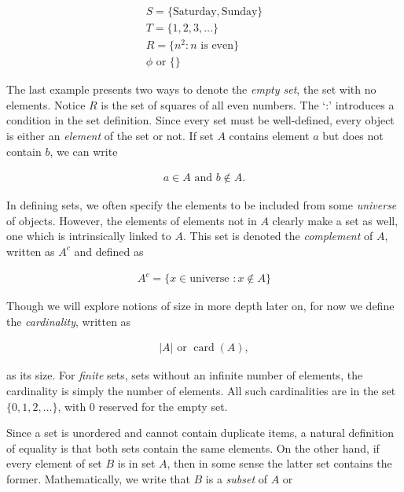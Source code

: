 \documentclass[twoside]{report}
\DeclareMathOperator{\card}{card}
\begin{document}
\begin{align*}
	S = \{\text{Saturday}, \text{Sunday}\} \\
	T = \{1, 2, 3, \dots \} \\
	R = \{n^2 : n \text{ is even} \} \\
	\phi \text{ or } \{ \}
\end{align*}

The last example presents two ways to denote the \emph{empty set},  the set with no elements. Notice $R$ is the set of squares of all even numbers. The `:' introduces a condition in the set definition. Since every set must be well-defined, every object is either an \emph{element}  of the set or not. If set $A$ contains element $a$ but does not contain $b$, we can write

\begin{align*}
	a \in A \text{ and } b \notin A.
\end{align*}

In defining sets, we often specify the elements to be included from some \emph{universe}  of objects. However, the elements of elements not in $A$ clearly make a set as well, one which is intrinsically linked to $A$. This set is denoted the \emph{complement}  of $A$, written as $A^c$ and defined as

\begin{align*}
	A^c = \{ x \in \text{universe } : x \notin A \}
\end{align*}

Though we will explore notions of size in more depth later on, for now we define the \emph{cardinality},  written as 

\begin{align*}
	|A| \text{ or } \card(A),
\end{align*}

as its size. For \emph{finite}  sets, sets without an infinite number of elements, the cardinality is simply the number of elements. All such cardinalities are in the set $\{0, 1, 2, \dots\}$, with 0 reserved for the empty set.

Since a set is unordered and cannot contain duplicate items, a natural definition of equality is that both sets contain the same elements. On the other hand, if every element of set $B$ is in set $A$, then in some sense the latter set contains the former. Mathematically, we write that $B$ is a \emph{subset}  of $A$ or
\end{document}

